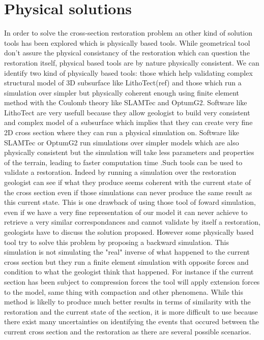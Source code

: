 \documentclass[12pt, a4paper]{memoir} %
\begin{document}
\section{Physical solutions}

In order to solve the cross-section restoration problem an other kind of solution tools has been explored which is physically based tools. While geometrical tool don't assure the physical consistancy of the restoration which can question the restoration itself, physical based tools are by nature physically consistent.  We can identify two kind of physically based tools: those which help validating 	complex structural model of 3D subsurface like LithoTect(ref) and those which run a simulation over simpler but physically coherent enough using finite element method with the Coulomb theory like SLAMTec and OptumG2.
Software like LithoTect are very usefull because they allow geologist to build very consistent and complex model of a subsurface which implies that they can create very fine 2D cross section where they can run a physical simulation on.
Software like SLAMTec or OptumG2 run simulations over simpler models which are also physically consistent but the simulation will take less parameters and properties of the terrain, leading to faster computation time .Such tools can be used to validate a restoration. Indeed by running a simulation over the restoration geologist can see if what they produce seems coherent with the current state of the cross section even if those simulations can never produce the same result as this current state. This is one drawback of using those tool of foward simulation, even if we have a very fine representation of our model it can never achieve to retrieve a very similar correspondances and cannot validate by itself a restoration, geologists have to discuss the solution proposed. However some physically based tool try to  solve this problem by proposing a backward simulation. This simulation is not simulating the "real" inverse of what happened to the current cross section but they run a finite element simulation with opposite forces and condition to what the geologist think that happened. For instance if the current section has been subject to compression forces the tool will apply extension forces to the model, same thing with compaction and other phenomena. While this method is likelly to produce much better results in terms of similarity with the restoration and the current state of the section, it is more difficult to use because there exist many uncertainties on identifying the events that occured between the current cross section and the restoration as there are several possible scenarios.
\end{document}
